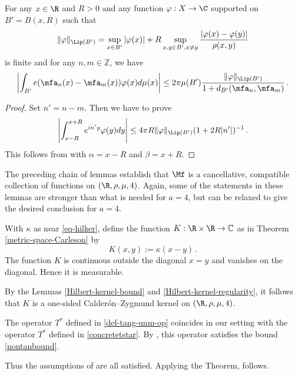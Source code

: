\begin{lemma}
\label{real-van-der-Corput}
    For any $x\in \R$ and $R>0$ and any
    function $\varphi: X\to \C$ supported on $B'=B(x,R)$
    such that
\begin{equation}
    \|\varphi\|_{\Lip(B')} = \sup_{x \in B'} |\varphi(x)| + R \sup_{x,y \in B', x \neq y} \frac{|\varphi(x) - \varphi(y)|}{\rho(x,y)}
\end{equation}
is finite and for any $n,m\in \mathbb{Z}$, we have
\begin{equation}
    \label{eq-vdc-cond1}
    \left|\int_{B'} e(\mfa_n(x)-{\mfa_m(x)}) \varphi(x) d\mu(x)\right|\le 2\pi \mu(B')\frac{\|\varphi\|_{\Lip(B')}}{1+d_{B'}(\mfa_n,\mfa_m)}
\, .
\end{equation}
\end{lemma}
\begin{proof}
Set $n'=n-m$. Then we have to prove
\begin{equation}
    \label{eq-vdc-cond2}
    \left|\int_{x-R}^{x+R} e^{in'y}\varphi(y) dy\right|\le 4\pi R\|\varphi\|_{\Lip(B')}
(1+2R|n'|)^{-1}\, .
\end{equation}
This follows from  with $\alpha = x - R$ and $\beta = x + R$.
\end{proof}

The preceding chain of lemmas establish that $\Mf$ is a cancellative, compatible collection of functions on $(\R, \rho, \mu, 4)$. Again, some of the statements in these lemmas are stronger than what is needed for $a=4$, but can be relaxed to give the desired conclusion for $a=4$.




With $\kappa$ as near \eqref{eq-hilker}, define
the function $K:\R\times \R\to \mathbb{C}$ as in Theorem
\ref{metric-space-Carleson} by
\begin{equation}
    K(x,y):=\kappa(x-y)\, .
\end{equation}
The function $K$ is continuous outside the diagonal
$x=y$ and vanishes on the diagonal. Hence it is measurable.


By the Lemmas \ref{Hilbert-kernel-bound} and \ref{Hilbert-kernel-regularity}, it follows that $K$ is a one-sided Calder\'on--Zygmund kernel on $(\R,\rho,\mu,4)$.


The operator $T^*$ defined in \eqref{def-tang-unm-op} coincides in our setting with the operator $T^*$ defined in \eqref{concretetstar}. By , this operator satisfies the bound \eqref{nontanbound}.




Thus the assumptions of  are all satisfied. Applying the Theorem,  follows.

\printbibliography
